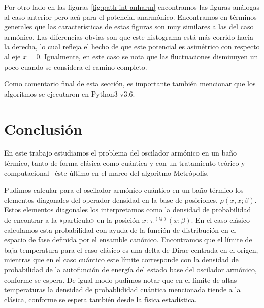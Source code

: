 \documentclass[%
 reprint,
 amsmath,amssymb,
 aps,
 pra,
]{revtex4-2}
\begin{document}
Por otro lado en las figuras \ref{fig:path-int-anharm} encontramos las figuras análogas al caso anterior pero acá para el potencial anarmónico. Encontramos en términos generales que las características de estas figuras son muy similares a las del caso armónico. Las diferencias obvias son que este histograma está más corrido hacia la derecha, lo cual refleja el hecho de que este potencial es asimétrico con respecto al eje $x=0$. Igualmente, en este caso se nota que las fluctuaciones disminuyen un poco cuando se considera el camino completo.

\begin{figure*}[!ht]
	\centering
	\texttt{[image: \{\{figures/pi\_x-pi-plots-anharmonic\_potential-beta\_4.000-N\_path\_10-N\_iter\_1000000-delta\_0.500-append\_every\_1-x\_max\_3.000]}}}
	\caption{\hl{caption}}
	\label{fig:path-int-anharm}
\end{figure*}



Como comentario final de esta sección, es importante también mencionar que los algoritmos se ejecutaron en Python3 v3.6.

\section{Conclusión\label{sec:conclusion}}

En este trabajo estudiamos el problema del oscilador armónico en un baño térmico, tanto de forma clásica como cuántica y con un tratamiento teórico y computacional –éste último en el marco del algoritmo Metrópolis.

Pudimos calcular para el oscilador armónico cuántico en un baño térmico los elementos diagonales del operador densidad en la base de posiciones, $\rho(x,x;\beta)$. Estos elementos diagonales los interpretamos como la densidad de probabilidad de encontrar a la «partícula» en la posición $x$: $\pi^{(Q)}(x;\beta)$. En el caso clásico calculamos esta probabilidad con ayuda de la función de distribución en el espacio de fase definida por el ensamble canónico. Encontramos que el límite de baja temperatura para el caso clásico es una delta de Dirac centrada en el origen, mientras que en el caso cuántico este límite corresponde con la densidad de probabilidad de la autofunción de energía del estado base del oscilador armónico, conforme se espera. De igual modo pudimos notar que en el límite de altas temperaturas la densidad de probablididad cuántica mencionada tiende a la clásica, conforme se espera también desde la física estadística. 
\end{document}
